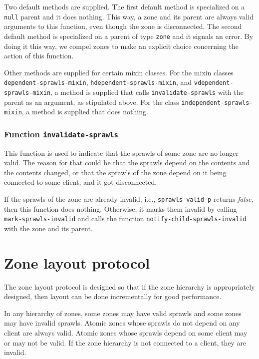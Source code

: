 \documentclass{report}
\begin{document}
Two default methods are supplied.  The first default method is
specialized on a \texttt{null} parent and it does nothing.  This way,
a zone and its parent are always valid arguments to this function,
even though the zone is disconnected.  The second default method is
specialized on a parent of type \texttt{zone} and it signals an error.
By doing it this way, we compel zones to make an explicit choice
concerning the action of this function.

Other methods are supplied for certain mixin classes.  For the mixin
classes \texttt{dependent-sprawls-mixin},
\texttt{hdependent-sprawls-mixin}, and \texttt{vdependent-sprawls-mixin},
a method is supplied that calls \texttt{invalidate-sprawls} with the
parent as an argument, as stipulated above.  For the class
\texttt{independent-sprawls-mixin}, a method is supplied that does
nothing.

\subsubsection{Function \texttt{invalidate-sprawls}}

This function is used to indicate that the sprawls of some zone are no
longer valid.  The reason for that could be that the sprawls depend on
the contents and the contents changed, or that the sprawls of the zone
depend on it being connected to some client, and it got disconnected.

If the sprawls of the zone are already invalid, i.e.,
\texttt{sprawls-valid-p} returns \emph{false}, then this function does
nothing.  Otherwise, it marks them invalid by calling
\texttt{mark-sprawls-invalid} and calls the function
\texttt{notify-child-sprawls-invalid} with the zone and its parent.

\section{Zone layout protocol}

The zone layout protocol is designed so that if the zone hierarchy is
appropriately designed, then layout can be done incrementally for good
performance. 

In any hierarchy of zones, some zones may have valid sprawls and some
zones may have invalid sprawls.  Atomic zones whose sprawls do not depend
on any client are always valid.  Atomic zones whose sprawls depend on
some client may or may not be valid.  If the zone hierarchy is not
connected to a client, they are invalid. 
\end{document}
